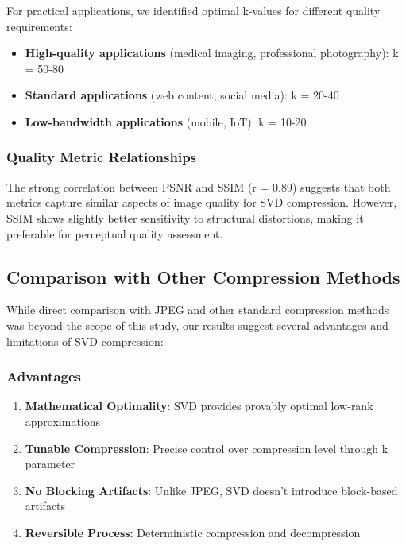 \documentclass[12pt,a4paper]{article}
\begin{document}
For practical applications, we identified optimal k-values for different quality requirements:

\begin{itemize}
    \item \textbf{High-quality applications} (medical imaging, professional photography): k = 50-80
    \item \textbf{Standard applications} (web content, social media): k = 20-40  
    \item \textbf{Low-bandwidth applications} (mobile, IoT): k = 10-20
\end{itemize}

\subsubsection{Quality Metric Relationships}

The strong correlation between PSNR and SSIM (r = 0.89) suggests that both metrics capture similar aspects of image quality for SVD compression. However, SSIM shows slightly better sensitivity to structural distortions, making it preferable for perceptual quality assessment.

\subsection{Comparison with Other Compression Methods}

While direct comparison with JPEG and other standard compression methods was beyond the scope of this study, our results suggest several advantages and limitations of SVD compression:

\subsubsection{Advantages}

\begin{enumerate}
    \item \textbf{Mathematical Optimality}: SVD provides provably optimal low-rank approximations
    \item \textbf{Tunable Compression}: Precise control over compression level through k parameter
    \item \textbf{No Blocking Artifacts}: Unlike JPEG, SVD doesn't introduce block-based artifacts
    \item \textbf{Reversible Process}: Deterministic compression and decompression
\end{enumerate}
\end{document}
